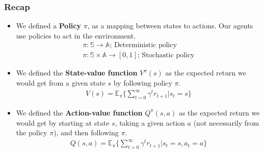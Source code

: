 

\begin{frame}
    \frametitle{Recap}
    \pause
    \begin{itemize}
        \item We defined a \textbf{Policy} $\pi$, as a mapping between states
              to actions. Our agents use policies to act in the environment.
              \begin{gather*}
                \pi : \mathbb{S} \rightarrow \mathbb{A} \scriptstyle{\text{; Deterministic policy}} \\
                \pi : \mathbb{S} \times \mathbb{A} \rightarrow [0,1] \scriptstyle{\text{; Stochastic policy}}
              \end{gather*}

        \pause

        \item We defined the \textbf{State-value function} $V^{\pi}(s)$ as the expected return
              we would get from a given state $s$ by following policy $\pi$.
            \begin{gather*}
                V(s) = \mathbb{E}_{\pi} \lbrace \sum_{t=0}^{\infty} \gamma^{t} r_{t+1} | s_{t} = s \rbrace
            \end{gather*}

        \pause

        \item We defined the \textbf{Action-value function} $Q^{\pi}(s,a)$ as the expected return
              we would get by starting at state $s$, taking a given action $a$ (not necessarily from
              the policy $\pi$), and then following $\pi$.
            \begin{gather*}
                Q(s,a) = \mathbb{E}_{\pi} \lbrace \sum_{t=0}^{\infty} \gamma^{t} r_{t+1} | s_{t} = s, a_{t} = a \rbrace
            \end{gather*}

    \end{itemize}
\end{frame}

